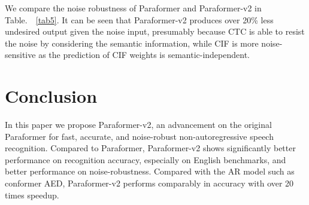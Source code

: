 \documentclass[runningheads]{llncs}
\begin{document}
We compare the noise robustness of Paraformer and Paraformer-v2 in Table.~~\ref{tab5}. It can be seen that Paraformer-v2 produces over 20\% less undesired output given the noise input, presumably because CTC is able to resist the noise by considering the semantic information, while CIF is more noise-sensitive as the prediction of CIF weights is semantic-independent.

\section{Conclusion}
In this paper we propose Paraformer-v2, an advancement on the original Paraformer for fast,  accurate, and noise-robust non-autoregressive speech recognition. Compared to Paraformer, Paraformer-v2 shows significantly better performance on recognition accuracy, especially on English benchmarks, and better performance on noise-robustness. Compared with the AR model such as conformer AED, Paraformer-v2 performs comparably in accuracy with over 20 times speedup.
\end{document}
